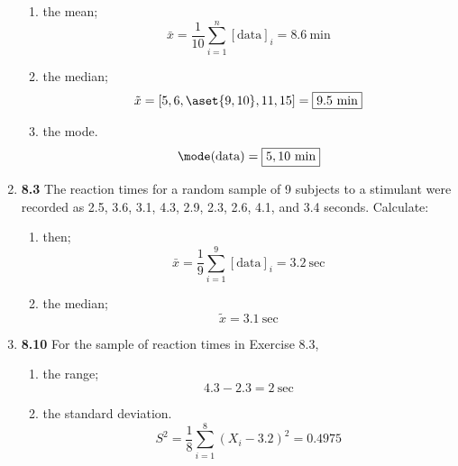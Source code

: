 \documentclass[basic, header]{nosvagor-notes}
\begin{document}
\begin{enumerate}[itemsep=2em]
\begin{enumerate}
      \item the mean;
        \[%
        \bar{x} = \frac{1}{10} \sum_{i=1}^{n} [\text{data}]_i = \boxed{8.6 ~\text{min}}
        \]%
      \item the median;
        \[%
          \tilde{x} = [5 , 6,  \aset{9 , 10} , 11 , 15] = \boxed{9.5 ~\text{min}}
        \]%
      \item the mode.
        \[%
          \mode(\text{data}) = \boxed{5, 10 ~\text{min}}
        \]%

    \end{enumerate}

  \newpage %

  \item \textbf{8.3} The reaction times for a random sample of 9 subjects to a
    stimulant were recorded as 2.5, 3.6, 3.1, 4.3, 2.9, 2.3, 2.6, 4.1, and 3.4
    seconds. Calculate:
    \begin{enumerate}

      \item then;
        \[%
        \bar{x} = \frac{1}{9} \sum_{i=1}^{9} [\text{data}]_i
        = \boxed{3.2 ~\text{sec}}
        \]%
      \item the median;
        \[%
          \tilde{x} = \boxed{3.1 ~\text{sec}}
        \]%

    \end{enumerate}

  \item \textbf{8.10} For the sample of reaction times in Exercise 8.3,
    \begin{enumerate}

      \item the range;
        \[%
          4.3 - 2.3 = \boxed{2~\text{sec}}
        \]%
      \item the standard deviation.
        \[%
          S^2 = \frac{1}{8} \sum_{i=1}^{8} \left( X_i - 3.2 \right)^2 = \boxed{0.4975}
        \]%


\end{enumerate}
\end{enumerate}
\end{document}
